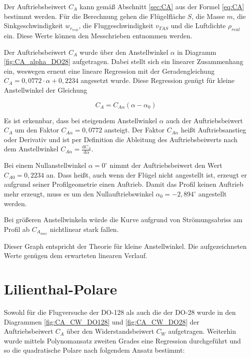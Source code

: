 Der Auftriebsbeiwert $C_A$ kann gemäß Abschnitt \ref{sec:CA} aus der Formel \ref{eq:CA} bestimmt werden. Für die Berechnung gehen die Flügelfläche $S$, die Masse $m$, die Sinkgeschwindigkeit $w_{r_{real}}$, die Fluggeschwindigkeit $v_{TAS}$ und die Luftdichte $\rho_{real}$ ein. Diese Werte können den Messchrieben entnommen werden.

Der Auftriebsbeiwert $C_A$ wurde über den Anstellwinkel $\alpha$ in Diagramm \ref{fig:CA_alpha_DO28} aufgetragen. Dabei stellt sich ein linearer Zusammenhang ein, weswegen erneut eine lineare Regression mit der Geradengleichung $C_A = 0,0772 \cdot \alpha + 0,2234$ angesetzt wurde. Diese Regression genügt für kleine Anstellwinkel der Gleichung 

\begin{equation}
C_A = C_{A \alpha} (\alpha - \alpha_0)
\end{equation}

Es ist erkennbar, dass bei steigendem  Anstellwinkel $\alpha$ auch der Auftriebsbeiwert $C_A$ um den Faktor $C_{A \alpha} = 0,0772$ ansteigt.  
Der Faktor $C_{A \alpha}$ heißt Auftriebsanstieg oder Derivativ und ist per Definition die Ableitung des Auftriebsbeiwerts nach dem Anstellwinkel $C_{A \alpha} = \frac{\mathrm{d} C_A}{\mathrm{d} \alpha}$. 

Bei einem Nullanstellwinkel $\alpha = 0^{\circ}$ nimmt der Auftriebsbeiwert den Wert $C_{A0} = 0,2234$ an. Dass heißt, auch wenn der Flügel nicht angestellt ist, erzeugt er aufgrund seiner Profilgeometrie einen Auftrieb. Damit das Profil keinen Auftrieb mehr erzeugt, muss es um den Nullauftriebswinkel $\alpha_0 = -2,894^{\circ}$ angestellt werden.

Bei größeren Anstellwinkeln würde die Kurve aufgrund von Strömungsabriss am Profil ab $C_{A_{max}}$ nichtlinear stark fallen.

Dieser Graph entspricht der Theorie für kleine Anstellwinkel. Die aufgezeichneten Werte genügen dem erwarteten linearen Verlauf.


\section{Lilienthal-Polare}
Sowohl für die Flugversuche der DO-128 als auch die der DO-28 wurde in den Diagrammen \ref{fig:CA_CW_DO128} und \ref{fig:CA_CW_DO28} der Auftriebsbeiwert $C_A$ über den Widerstandsbeiwert $C_W$ aufgetragen. Weiterhin wurde mittels Polynomansatz zweiten Grades eine Regression durchgeführt und so die quadratische Polare nach folgendem Ansatz bestimmt:

